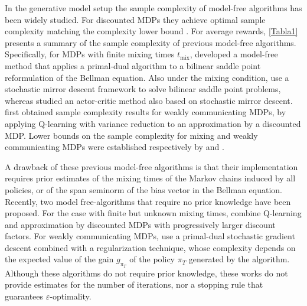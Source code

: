 In the generative model setup \citep{kearns1998finite} the sample complexity of model-free algorithms has been widely studied. For  discounted MDPs they achieve  optimal sample complexity matching the complexity lower bound \cite{sidford2018near,wainwright2019variance,jin2024truncated}.
For average rewards, \cref{Tabla1} presents a summary of the sample complexity of previous model-free algorithms. Specifically, for MDPs with finite mixing times $t_{\text{mix}}$, \citet{wang2017primal}  developed a model-free method that applies a primal-dual algorithm to a bilinear saddle point reformulation of the Bellman equation.  Also under the mixing  condition, \citet{jin2020efficiently} use a stochastic mirror descent framework to solve bilinear saddle point problems, whereas \citet{li2024stochastic} studied an actor-critic method also based on stochastic mirror descent. \citet{zhang2023sharper} first obtained sample complexity results for weakly communicating MDPs, by applying Q-learning with variance reduction to an approximation by a discounted 
MDP. Lower bounds on the sample complexity for mixing and weakly communicating MDPs were established respectively by \citet{jin2021towards} and \citet{wang2022near}.

A drawback of these previous model-free algorithms is that their implementation requires prior estimates of the
mixing times of the Markov chains induced by all policies,
or of the span seminorm of the bias vector in the Bellman equation. 
Recently, two model free-algorithms that require no prior knowledge have been proposed. For the case with finite but  unknown mixing times, \citet{jin2024feasible} combine Q-learning and approximation by discounted MDPs  with progressively larger discount factors. For weakly communicating MDPs, \citet{neu2024dealing} use a primal-dual stochastic gradient descent combined with a regularization technique, whose complexity depends on the expected value of the gain $g_{\pi_T}$ of the policy $\pi_T$ generated by the algorithm. Although these algorithms do not require prior knowledge, these works do not provide estimates for the number of iterations, nor  a stopping rule that guarantees $\varepsilon$-optimality. 

